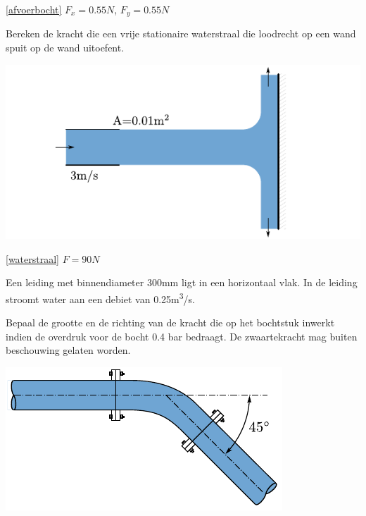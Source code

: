	\begin{antwoord}{\ref{afvoerbocht}}
		$F_x = 0.55\unit{N}$, $F_y = 0.55\unit{N}$
	\end{antwoord}
	\begin{toepassing}[*]
		\label{waterstraal}
Bereken de kracht die een vrije stationaire waterstraal die loodrecht op een wand spuit op de wand uitoefent.
		\begin{center}
			\includegraphics{fig/behoudsvergelijkingen/waterstraal}
		\end{center}
	\end{toepassing}
	\begin{antwoord}{\ref{waterstraal}}
		$F = 90\unit{N}$
	\end{antwoord}
	\begin{toepassing}[*]
		\label{45gradenbocht}
Een leiding met binnendiameter 300mm ligt in een horizontaal vlak. In de leiding stroomt water aan een debiet van 0.25\unit{m^3/s}.    

Bepaal de grootte en de richting van de kracht die op het bochtstuk inwerkt indien de overdruk voor de bocht 0.4 bar bedraagt. De zwaartekracht mag buiten beschouwing gelaten worden.

\centering
\includegraphics{fig/behoudsvergelijkingen/45gradenbocht}
	\end{toepassing}
